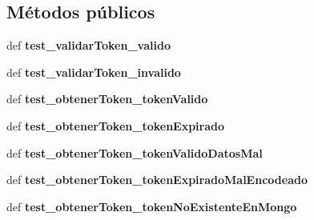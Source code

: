 \subsection*{Métodos públicos}
\begin{DoxyCompactItemize}
\item 
\hypertarget{classsrc_1_1tests_1_1test__token_1_1_test_token_a8aba7c3cd985db73a4308906cce602dc}{def {\bfseries test\-\_\-validar\-Token\-\_\-valido}}\label{classsrc_1_1tests_1_1test__token_1_1_test_token_a8aba7c3cd985db73a4308906cce602dc}

\item 
\hypertarget{classsrc_1_1tests_1_1test__token_1_1_test_token_a2422e590a46f5250a9b9cccbe827f9fa}{def {\bfseries test\-\_\-validar\-Token\-\_\-invalido}}\label{classsrc_1_1tests_1_1test__token_1_1_test_token_a2422e590a46f5250a9b9cccbe827f9fa}

\item 
\hypertarget{classsrc_1_1tests_1_1test__token_1_1_test_token_a87957ef104bfeba015dba8bfd7249cca}{def {\bfseries test\-\_\-obtener\-Token\-\_\-token\-Valido}}\label{classsrc_1_1tests_1_1test__token_1_1_test_token_a87957ef104bfeba015dba8bfd7249cca}

\item 
\hypertarget{classsrc_1_1tests_1_1test__token_1_1_test_token_a226ddb6f0540681775777a5b1520a0ac}{def {\bfseries test\-\_\-obtener\-Token\-\_\-token\-Expirado}}\label{classsrc_1_1tests_1_1test__token_1_1_test_token_a226ddb6f0540681775777a5b1520a0ac}

\item 
\hypertarget{classsrc_1_1tests_1_1test__token_1_1_test_token_afd81b1535b8cd821736efda5964b3c59}{def {\bfseries test\-\_\-obtener\-Token\-\_\-token\-Valido\-Datos\-Mal}}\label{classsrc_1_1tests_1_1test__token_1_1_test_token_afd81b1535b8cd821736efda5964b3c59}

\item 
\hypertarget{classsrc_1_1tests_1_1test__token_1_1_test_token_a9fdd70c5fd20ad1ab09d53377857991a}{def {\bfseries test\-\_\-obtener\-Token\-\_\-token\-Expirado\-Mal\-Encodeado}}\label{classsrc_1_1tests_1_1test__token_1_1_test_token_a9fdd70c5fd20ad1ab09d53377857991a}

\item 
\hypertarget{classsrc_1_1tests_1_1test__token_1_1_test_token_acc07ef6db3b245a9d4e0d33a5cb2ec46}{def {\bfseries test\-\_\-obtener\-Token\-\_\-token\-No\-Existente\-En\-Mongo}}\label{classsrc_1_1tests_1_1test__token_1_1_test_token_acc07ef6db3b245a9d4e0d33a5cb2ec46}


\end{DoxyCompactItemize}
